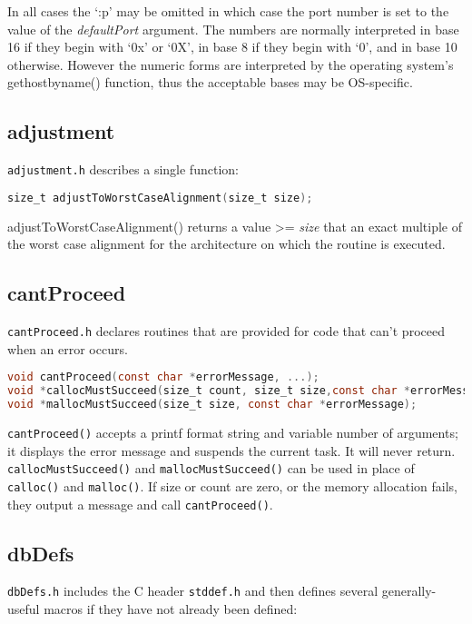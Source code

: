 In all cases the `:p' may be omitted in which case the port number is set to the value of the \emph{defaultPort} argument.
The numbers are normally interpreted in base 16 if they begin with `0x' or `0X', in base 8 if they begin with `0', and in base 10 otherwise.
However the numeric forms are interpreted by the operating system's gethostbyname() function, thus the acceptable bases may be OS-specific.

\subsection{adjustment}

\verb|adjustment.h| describes a single function:

\begin{lstlisting}[language=C]
size_t adjustToWorstCaseAlignment(size_t size);
\end{lstlisting}

adjustToWorstCaseAlignment() returns a value \textgreater{}= \emph{size} that an exact multiple of the worst case alignment for the architecture on which the routine is executed.

\subsection{cantProceed}

\verb|cantProceed.h| declares routines that are provided for code that can't proceed when an error occurs.

\begin{lstlisting}[language=C]
void cantProceed(const char *errorMessage, ...);
void *callocMustSucceed(size_t count, size_t size,const char *errorMessage);
void *mallocMustSucceed(size_t size, const char *errorMessage);
\end{lstlisting}

\verb|cantProceed()| accepts a printf format string and variable number of arguments; it displays the error message and suspends the current task.
It will never return.
\verb|callocMustSucceed()| and \verb|mallocMustSucceed()| can be used in place of \verb|calloc()| and \verb|malloc()|.
If size or count are zero, or the memory allocation fails, they output a message and call \verb|cantProceed()|.

\subsection{dbDefs}
\verb|dbDefs.h| includes the C header \verb|stddef.h| and then defines several generally-useful macros if they have not already been defined:

